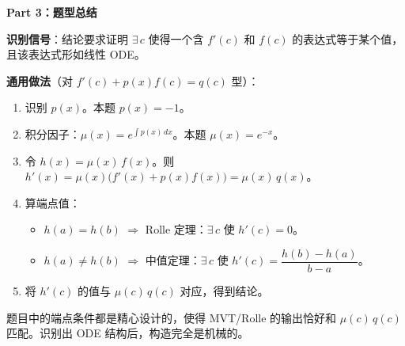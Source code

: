 \documentclass[12pt,a4paper]{ctexart}
\theoremstyle{plain}
\begin{document}
\bigskip
\noindent\textbf{Part 3：题型总结}

\medskip
\textbf{识别信号}：结论要求证明 $\exists\,c$ 使得一个含 $f'(c)$ 和 $f(c)$ 的表达式等于某个值，且该表达式形如线性 ODE。

\textbf{通用做法}（对 $f'(c)+p(x)f(c)=q(c)$ 型）：
\begin{enumerate}
  \item 识别 $p(x)$。本题 $p(x)=-1$。
  \item 积分因子：$\mu(x)=e^{\int p(x)\,dx}$。本题 $\mu(x)=e^{-x}$。
  \item 令 $h(x)=\mu(x)\,f(x)$。则 $h'(x)=\mu(x)\bigl(f'(x)+p(x)f(x)\bigr)=\mu(x)\,q(x)$。
  \item 算端点值：
    \begin{itemize}
      \item $h(a)=h(b)$ $\Longrightarrow$ Rolle 定理：$\exists\,c$ 使 $h'(c)=0$。
      \item $h(a)\neq h(b)$ $\Longrightarrow$ 中值定理：$\exists\,c$ 使 $h'(c)=\dfrac{h(b)-h(a)}{b-a}$。
    \end{itemize}
  \item 将 $h'(c)$ 的值与 $\mu(c)\,q(c)$ 对应，得到结论。
\end{enumerate}

题目中的端点条件都是精心设计的，使得 MVT/Rolle 的输出恰好和 $\mu(c)\,q(c)$ 匹配。识别出 ODE 结构后，构造完全是机械的。
\end{document}
